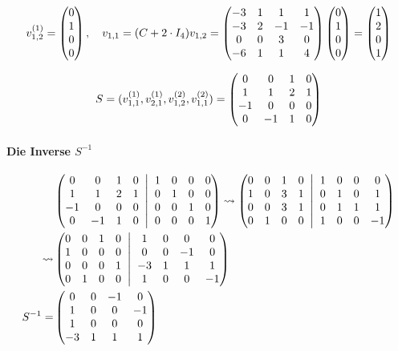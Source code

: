 \documentclass{article}
\begin{document}
\[
v_{1,2}^{(1)} = \begin{pmatrix}0\\1\\0\\0\end{pmatrix}, \quad v_{1,1} = (C + 2\cdot I_4)v_{1,2} = \begin{pmatrix}-3&1&1&1\\-3&2&-1&-1\\0&0&3&0\\-6&1&1&4\end{pmatrix}\begin{pmatrix}0\\1\\0\\0\end{pmatrix} = \begin{pmatrix}1\\2\\0\\1\end{pmatrix}
\]

\[S = (v_{1,1}^{(1)}, v_{2,1}^{(1)}, v_{1,2}^{(2)}, v_{1,1}^{(2)}) = \begin{pmatrix}0&0&1&0\\1&1&2&1\\-1&0&0&0\\0&-1&1&0\end{pmatrix}\]

\paragraph{Die Inverse $S^{-1}$}
\begin{align*}
&\left(\begin{matrix}
0&0&1&0\\1&1&2&1\\-1&0&0&0\\0&-1&1&0
\end{matrix}
\;\;\middle|\;\;
\begin{matrix}
1&0&0&0\\0&1&0&0\\0&0&1&0\\0&0&0&1
\end{matrix}
\right)\rightsquigarrow
\left(\begin{matrix}
0&0&1&0\\1&0&3&1\\0&0&3&1\\0&1&0&0
\end{matrix}
\;\;\middle|\;\;
\begin{matrix}
1&0&0&0\\0&1&0&1\\0&1&1&1\\1&0&0&-1
\end{matrix}
\right)\\
\rightsquigarrow
&\left(\begin{matrix}
0&0&1&0\\1&0&0&0\\0&0&0&1\\0&1&0&0
\end{matrix}
\;\;\middle|\;\;
\begin{matrix}
1&0&0&0\\0&0&-1&0\\-3&1&1&1\\1&0&0&-1
\end{matrix}
\right)\\
S^{-1} =& \begin{pmatrix}0&0&-1&0\\1&0&0&-1\\1&0&0&0\\-3&1&1&1\end{pmatrix}
\end{align*}
\end{document}
